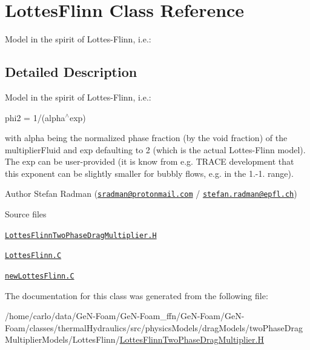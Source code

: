 \hypertarget{classFoam_1_1LottesFlinn}{}\section{Lottes\+Flinn Class Reference}
\label{classFoam_1_1LottesFlinn}


Model in the spirit of Lottes-\/\+Flinn, i.\+e.\+:  




\subsection{Detailed Description}
Model in the spirit of Lottes-\/\+Flinn, i.\+e.\+: 

\label{_Description}%
 phi2 = 1/(alpha$^\wedge$exp)

with alpha being the normalized phase fraction (by the void fraction) of the multiplier\+Fluid and exp defaulting to 2 (which is the actual Lottes-\/\+Flinn model). The exp can be user-\/provided (it is know from e.\+g. T\+R\+A\+CE development that this exponent can be slightly smaller for bubbly flows, e.\+g. in the 1.-\/1. range).

Author Stefan Radman (\href{mailto:sradman@protonmail.com}{\tt sradman@protonmail.\+com} / \href{mailto:stefan.radman@epfl.ch}{\tt stefan.\+radman@epfl.\+ch})

\begin{DoxyParagraph}{Source files}

\begin{DoxyItemize}
\item \href{../../../home/carlo/data/GeN-Foam/GeN-Foam_ffn/GeN-Foam/GeN-Foam/classes/thermalHydraulics/src/physicsModels/dragModels/twoPhaseDragMultiplierModels/LottesFlinn/LottesFlinnTwoPhaseDragMultiplier.H}{\tt Lottes\+Flinn\+Two\+Phase\+Drag\+Multiplier.\+H} 
\item \href{../../../home/carlo/data/GeN-Foam/GeN-Foam_ffn/GeN-Foam/GeN-Foam/classes/thermalHydraulics/src/physicsModels/dragModels/twoPhaseDragMultiplierModels/LottesFlinn/LottesFlinn.C}{\tt Lottes\+Flinn.\+C} 
\item \href{../../../home/carlo/data/GeN-Foam/GeN-Foam_ffn/GeN-Foam/GeN-Foam/classes/thermalHydraulics/src/physicsModels/dragModels/twoPhaseDragMultiplierModels/LottesFlinn/newLottesFlinn.C}{\tt new\+Lottes\+Flinn.\+C} 
\end{DoxyItemize}
\end{DoxyParagraph}


The documentation for this class was generated from the following file\+:\begin{DoxyCompactItemize}
\item 
/home/carlo/data/\+Ge\+N-\/\+Foam/\+Ge\+N-\/\+Foam\+\_\+ffn/\+Ge\+N-\/\+Foam/\+Ge\+N-\/\+Foam/classes/thermal\+Hydraulics/src/physics\+Models/drag\+Models/two\+Phase\+Drag\+Multiplier\+Models/\+Lottes\+Flinn/\hyperlink{LottesFlinnTwoPhaseDragMultiplier_8H}{Lottes\+Flinn\+Two\+Phase\+Drag\+Multiplier.\+H}\end{DoxyCompactItemize}
